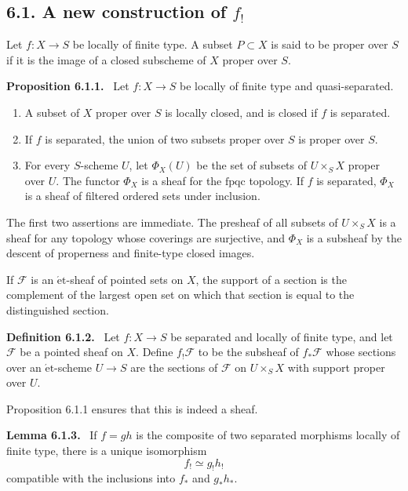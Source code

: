 \documentclass[12pt]{article}
\newcommand{\Ff}{\mathcal F}
\newcommand{\et}{\mathrm{\acute et}}
\newcommand{\fpqc}{\mathrm{fpqc}}
\newenvironment{statement}[1]{\par\medskip\noindent\textbf{#1.}\ }{\par\medskip}
\begin{document}
\subsection*{6.1. A new construction of \(f_!\)}

Let \(f:X\to S\) be locally of finite type. A subset \(P\subset X\) is said to be proper over \(S\) if it is the image of a closed subscheme of \(X\) proper over \(S\).

\begin{statement}{Proposition 6.1.1}
Let \(f:X\to S\) be locally of finite type and quasi-separated.
\begin{enumerate}[label=(\roman*)]
\item A subset of \(X\) proper over \(S\) is locally closed, and is closed if \(f\) is separated.
\item If \(f\) is separated, the union of two subsets proper over \(S\) is proper over \(S\).
\item For every \(S\)-scheme \(U\), let \(\Phi_X(U)\) be the set of subsets of \(U\times_SX\) proper over \(U\). The functor \(\Phi_X\) is a sheaf for the \(\fpqc\) topology. If \(f\) is separated, \(\Phi_X\) is a sheaf of filtered ordered sets under inclusion.
\end{enumerate}
\end{statement}

The first two assertions are immediate. The presheaf of all subsets of \(U\times_SX\) is a sheaf for any topology whose coverings are surjective, and \(\Phi_X\) is a subsheaf by the descent of properness and finite-type closed images.

If \(\Ff\) is an \(\et\)-sheaf of pointed sets on \(X\), the support of a section is the complement of the largest open set on which that section is equal to the distinguished section.

\begin{statement}{Definition 6.1.2}
Let \(f:X\to S\) be separated and locally of finite type, and let \(\Ff\) be a pointed sheaf on \(X\). Define \(f_!\Ff\) to be the subsheaf of \(f_*\Ff\) whose sections over an \(\et\)-scheme \(U\to S\) are the sections of \(\Ff\) on \(U\times_SX\) with support proper over \(U\).
\end{statement}

Proposition 6.1.1 ensures that this is indeed a sheaf.

\begin{statement}{Lemma 6.1.3}
If \(f=gh\) is the composite of two separated morphisms locally of finite type, there is a unique isomorphism
\[
f_!\simeq g_!h_!
\]
compatible with the inclusions into \(f_*\) and \(g_*h_*\).
\end{statement}
\end{document}
